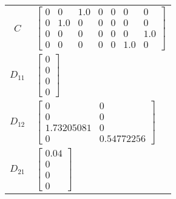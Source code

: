 \begin{tabular}{cl}
   $C$    & $\left[\begin{matrix}0 & 0 & 1.0 & 0 & 0 & 0 & 0\\0 & 1.0 & 0 & 0 & 0 & 0 & 0\\0 & 0 & 0 & 0 & 0 & 0 & 1.0\\0 & 0 & 0 & 0 & 0 & 1.0 & 0\end{matrix}\right]$                                                                                                                            \\
 $D_{11}$ & $\left[\begin{matrix}0\\0\\0\\0\end{matrix}\right]$                                                                                                                                                                                                                                    \\
 $D_{12}$ & $\left[\begin{matrix}0 & 0\\0 & 0\\1.73205081 & 0\\0 & 0.54772256\end{matrix}\right]$                                                                                                                                                                                                  \\
 $D_{21}$ & $\left[\begin{matrix}0.04\\0\\0\\0\end{matrix}\right]$                                                                                                                                                                                                                                 \\
\hline
\end{tabular}